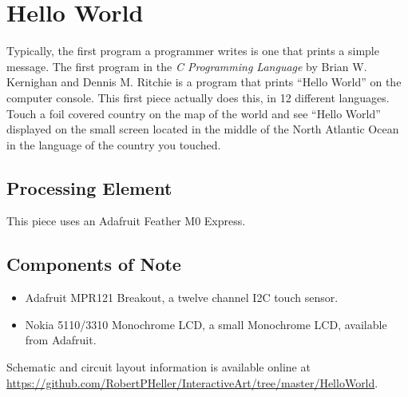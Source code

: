 %
%
%
%
% 
%
%
%
%
%
% 
%

\section{Hello World}

Typically, the first program a programmer writes is one that prints a simple 
message.  The first program in the \textit{C Programming Language} by  Brian 
W. Kernighan and Dennis M. Ritchie is a program that prints ``Hello World'' on 
the computer console.  This first piece actually does this, in 12 different 
languages.  Touch a foil covered country on the map of the world and see 
``Hello World'' displayed on the small screen located in the middle of the 
North Atlantic Ocean in the language of the country you touched.

\subsection*{Processing Element}

This piece uses an Adafruit Feather M0 Express.

\subsection*{Components of Note}

\begin{itemize}
\item Adafruit MPR121 Breakout, a twelve channel I2C touch sensor.
\item Nokia 5110/3310 Monochrome LCD, a small Monochrome LCD, available from 
Adafruit.
\end{itemize}

Schematic and circuit layout information is available online at 
\url{https://github.com/RobertPHeller/InteractiveArt/tree/master/HelloWorld}.

